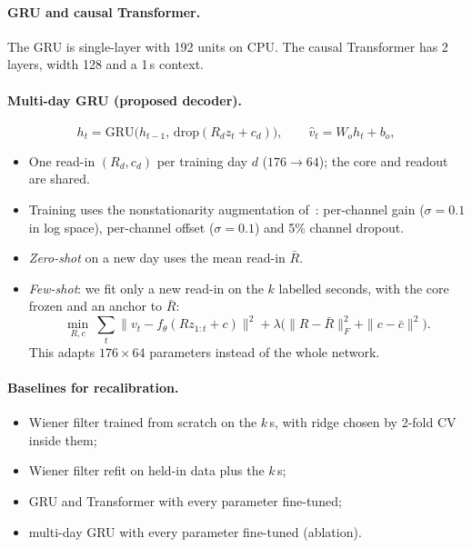 \paragraph{GRU and causal Transformer.} The GRU is single-layer with 192 units on CPU.
The causal Transformer has 2 layers, width 128 and a 1\,s context.

\paragraph{Multi-day GRU (proposed decoder).}
\begin{equation}
h_t=\mathrm{GRU}\big(h_{t-1},\,\mathrm{drop}(R_d z_t+c_d)\big),\qquad \hat v_t=W_oh_t+b_o ,
\end{equation}
\begin{itemize}
\item One read-in $(R_d,c_d)$ per training day $d$ ($176\to64$); the core and readout
  are shared.
\item Training uses the nonstationarity augmentation of~\cite{sussillo2016making}:
  per-channel gain ($\sigma=0.1$ in log space), per-channel offset ($\sigma=0.1$) and
  5\% channel dropout.
\item \emph{Zero-shot} on a new day uses the mean read-in $\bar R$.
\item \emph{Few-shot}: we fit only a new read-in on the $k$ labelled seconds, with the
  core frozen and an anchor to $\bar R$:
\begin{equation}
\min_{R,c}\ \sum_t\big\|v_t-f_\theta(Rz_{1:t}+c)\big\|^2+\lambda\big(\|R-\bar R\|_F^2+\|c-\bar c\|^2\big).
\end{equation}
  This adapts $176\times64$ parameters instead of the whole network.
\end{itemize}

\paragraph{Baselines for recalibration.}
\begin{itemize}
\item Wiener filter trained from scratch on the $k$\,s, with ridge chosen by 2-fold CV
  inside them;
\item Wiener filter refit on held-in data plus the $k$\,s;
\item GRU and Transformer with every parameter fine-tuned;
\item multi-day GRU with every parameter fine-tuned (ablation).
\end{itemize}

